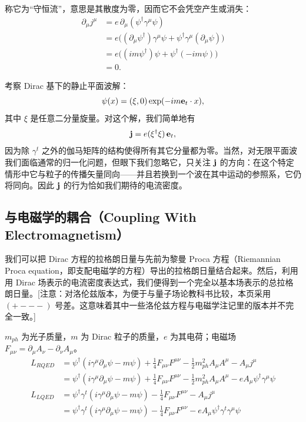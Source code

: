 称它为“守恒流”，意思是其散度为零，因而它不会凭空产生或消失：
\begin{align*}
\partial_{\mu}j^{\mu}
&= e\,\partial_{\mu}(\psi^{\dagger}\gamma^{\mu}\psi)\\
&= e\bigl((\partial_{\mu}\psi^{\dagger})\gamma^{\mu}\psi+\psi^{\dagger}\gamma^{\mu}(\partial_{\mu}\psi)\bigr)\\
&= e\bigl((im\psi^{\dagger})\psi+\psi^{\dagger}(-im\psi)\bigr)\\
&= 0 .
\end{align*}

考察 Dirac 基下的静止平面波解：
\begin{equation}
\psi(x)=(\xi,0)\exp(-im\mathbf{e}_{t}\cdot x),
\end{equation}
其中 $\xi$ 是任意二分量旋量。对这个解，我们简单地有
\begin{equation}
\mathbf{j}=e(\xi^{\dagger}\xi)\,\mathbf{e}_{t},
\end{equation}
因为除 $\gamma^{t}$ 之外的伽马矩阵的结构使得所有其它分量都为零。当然，对无限平面波我们面临通常的归一化问题，但眼下我们忽略它，只关注 $\mathbf{j}$ 的方向：在这个特定情形中它与粒子的传播矢量同向——并且若换到一个波在其中运动的参照系，它仍将同向。因此 $\mathbf{j}$ 的行为恰如我们期待的电流密度。

\subsection{与电磁学的耦合（Coupling With Electromagnetism）}

我们可以把 Dirac 方程的拉格朗日量与先前为黎曼 Proca 方程（Riemannian Proca equation，即支配电磁学的方程）导出的拉格朗日量结合起来。然后，利用用 Dirac 场表示的电流密度表达式，我们便得到一个完全以基本场表示的总拉格朗日量。[注意：对洛伦兹版本，为便于与量子场论教科书比较，本页采用 $(+---)$ 号差。这意味着其中一些洛伦兹方程与电磁学注记里的版本并不完全一致。]

\begin{keybox}[量子电动力学的拉格朗日量]
$m_{ph}$ 为光子质量，$m$ 为 Dirac 粒子的质量，$e$ 为其电荷；电磁场 $F_{\mu\nu}=\partial_{\mu}A_{\nu}-\partial_{\nu}A_{\mu}$。
\begin{align}
L_{RQED} &= \psi^{\dagger}(i\gamma^{\mu}\partial_{\mu}\psi-m\psi)+\tfrac14 F_{\mu\nu}F^{\mu\nu}-\tfrac12 m_{ph}^{2}A_{\mu}A^{\mu}-A_{\mu}j^{\mu} \nonumber\\
&= \psi^{\dagger}(i\gamma^{\mu}\partial_{\mu}\psi-m\psi)+\tfrac14 F_{\mu\nu}F^{\mu\nu}-\tfrac12 m_{ph}^{2}A_{\mu}A^{\mu}-eA_{\mu}\psi^{\dagger}\gamma^{\mu}\psi \tag{Riemannian}\\[4pt]
L_{LQED} &= \psi^{\dagger}\gamma^{t}(i\gamma^{\mu}\partial_{\mu}\psi-m\psi)-\tfrac14 F_{\mu\nu}F^{\mu\nu}-A_{\mu}j^{\mu} \nonumber\\
&= \psi^{\dagger}\gamma^{t}(i\gamma^{\mu}\partial_{\mu}\psi-m\psi)-\tfrac14 F_{\mu\nu}F^{\mu\nu}-eA_{\mu}\psi^{\dagger}\gamma^{t}\gamma^{\mu}\psi \tag{Lorentzian}
\end{align}
\end{keybox}

